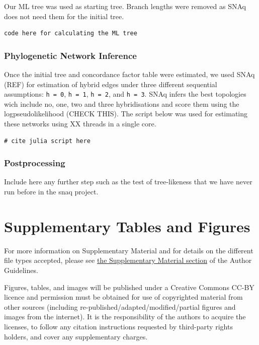\documentclass[utf8]{frontiers_suppmat} %
\begin{document}
Our ML tree was used as starting tree. Branch lengths were removed as SNAq does not need them for the initial tree.

\begin{verbatim}
code here for calculating the ML tree
\end{verbatim}

\subsubsection{Phylogenetic Network Inference}

Once the initial tree and concordance factor table were estimated, we used SNAq (REF) for estimation of hybrid edges under three different sequential assumptions: \texttt{h = 0}, \texttt{h = 1}, \texttt{h = 2}, and \texttt{h = 3}. SNAq infers the best topologies wich include no, one, two and three hybridisations and score them using the logpseudolikelihood (CHECK THIS). The script below was used for estimating these networks using XX threads in a single core.

\begin{verbatim}
# cite julia script here
\end{verbatim}

\subsubsection{Postprocessing}

Include here any further step such as the test of tree-likeness that we have never run before in the snaq project.

\section{Supplementary Tables and Figures}

For more information on Supplementary Material and for details on the different file types accepted, please see \href{http://home.frontiersin.org/about/author-guidelines#SupplementaryMaterial}{the Supplementary Material section} of the Author Guidelines.

Figures, tables, and images will be published under a Creative Commons CC-BY licence and permission must be obtained for use of copyrighted material from other sources (including re-published/adapted/modified/partial figures and images from the internet). It is the responsibility of the authors to acquire the licenses, to follow any citation instructions requested by third-party rights holders, and cover any supplementary charges.
\end{document}
